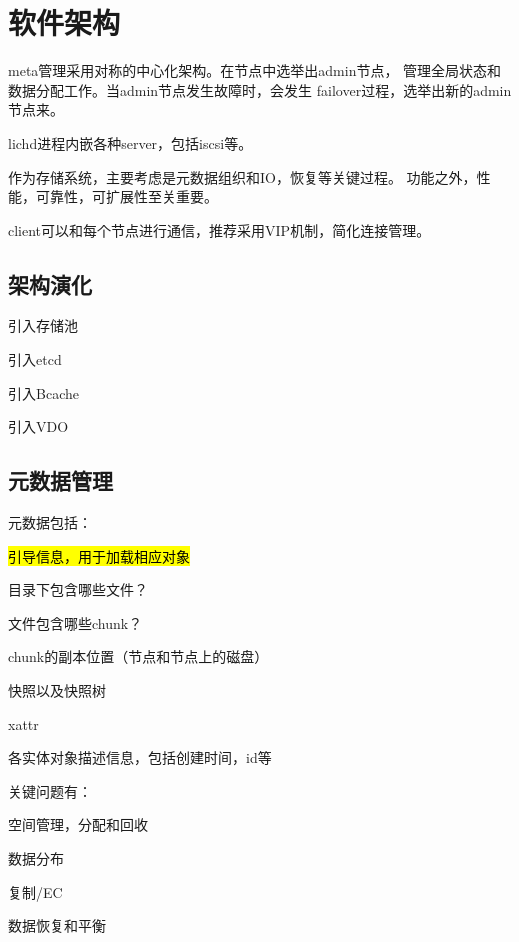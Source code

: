 \chapter{软件架构}

meta管理采用对称的中心化架构。在节点中选举出admin节点，
管理全局状态和数据分配工作。当admin节点发生故障时，会发生
failover过程，选举出新的admin节点来。

lichd进程内嵌各种server，包括iscsi等。

作为存储系统，主要考虑是元数据组织和IO，恢复等关键过程。
功能之外，性能，可靠性，可扩展性至关重要。

client可以和每个节点进行通信，推荐采用VIP机制，简化连接管理。

\section{架构演化}

\begin{enumbox}
\item{引入存储池}
\item{引入etcd}
\item{引入Bcache}
\item{引入VDO}
\end{enumbox}

\section{元数据管理}

元数据包括：
\begin{enumbox}
\item \hl{引导信息，用于加载相应对象}
\item 目录下包含哪些文件？
\item 文件包含哪些chunk？
\item chunk的副本位置（节点和节点上的磁盘）
\item 快照以及快照树
\item xattr
\item 各实体对象描述信息，包括创建时间，id等
\end{enumbox}

关键问题有：
\begin{enumbox}
\item 空间管理，分配和回收
\item 数据分布
\item 复制/EC
\item 数据恢复和平衡
\end{enumbox}

